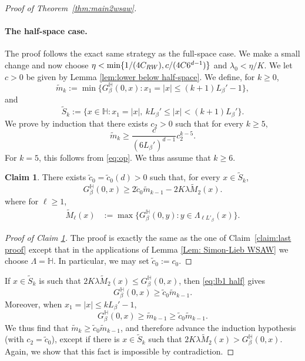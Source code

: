 \documentclass[11pt,a4paper]{article}
\numberwithin{equation}{section}
\theoremstyle{plain}
\theoremstyle{definition}
\newtheorem{Claim}[Thm]{Claim}
\begin{document}
\begin{proof}[Proof of Theorem~\textup{\ref{thm:main2wsaw}}]
\paragraph{The half-space case.} The proof follows the exact same strategy as the full-space case. We make a small change and now choose $\eta<\min\{1/(4C_{\rm RW}),c/(4C6^{d-1})\}$ and $\lambda_0<\eta/K$. We let $c>0$ be given by Lemma \ref{lem:lower below half-space}. We define, for $k\geq 0$,
\begin{equation}
	\tilde m_k:=\min \{G_\beta^{\mathbb H}(0,x): x_1=|x|\leq (k+1)L_\beta'-1\},
\end{equation}
and
\begin{equation}
	\tilde{S}_k:=\{x\in \mathbb H: x_1=|x|, \: kL_\beta'\leq |x|<(k+1)L_\beta'\}.
\end{equation}
We prove by induction that there exists $c_2>0$ such that for every $k\geq 5$,
\begin{equation}
	\tilde{m}_k\geq \frac{c}{(6L_\beta')^{d-1}}c_2^{k-5}.
\end{equation}
For $k=5$, this follows from \eqref{eq:op}. We thus assume that $k\geq 6$.

\begin{Claim}\label{claim: first claim half case}
There exists $\tilde{c}_0=\tilde{c}_0(d)>0$ such that, for every $x\in \tilde{S}_k$,
\begin{equation}\label{eq:lb1 half}
 G_\beta^{\mathbb H}(0,x)\geq 2\tilde{c}_0\tilde{m}_{k-1}-2K\lambda \tilde{M}_2(x).
\end{equation}
where
for $\ell\geq 1$,
\begin{align}
\tilde{M}_\ell(x)&:=\max\{G_\beta^{\mathbb H}(0,y):y\in \Lambda_{\ell L'_\beta}(x)\}.\end{align}
\end{Claim}
\begin{proof}[Proof of Claim \textup{\ref{claim: first claim half case}}] The proof is exactly the same as the one of Claim~\ref{claim:last proof} except that in the applications of Lemma \ref{Lem: Simon-Lieb WSAW} we choose $\Lambda=\mathbb H$. In particular, we may set $\tilde{c}_0:=c_0$.
\end{proof}
If $x\in \tilde{S}_k$ is such that $2K\lambda \tilde{M}_2(x)\le G_\beta^{\mathbb H}(0,x)$, then \eqref{eq:lb1 half} gives
\begin{equation}\label{eq:lb2 half}
G_\beta^{\mathbb H}(0,x)\ge \tilde{c}_0 \tilde{m}_{k-1}.
\end{equation}
Moreover, when $x_1=|x|\leq kL_\beta'-1$,
\begin{equation}
	G_\beta^{\mathbb H}(0,x)\geq \tilde{m}_{k-1}\geq \tilde{c}_0\tilde{m}_{k-1}.
\end{equation}
We thus find that $\tilde{m}_k\ge \tilde{c}_0\tilde{m}_{k-1}$, and therefore advance the induction hypothesis (with $c_2=\tilde{c}_0$), except if there is $x\in \tilde{S}_k$ such that $2K\lambda \tilde{M}_2(x)> G_\beta^{\mathbb H}(0,x)$. Again, we show that this fact is impossible by contradiction.


\end{proof}
\end{document}
